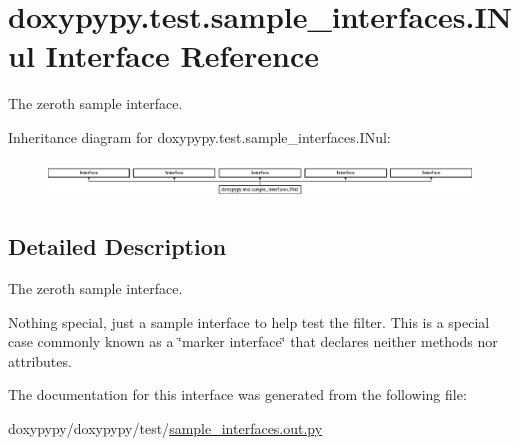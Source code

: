 \hypertarget{classdoxypypy_1_1test_1_1sample__interfaces_1_1_i_nul}{\section{doxypypy.\-test.\-sample\-\_\-interfaces.\-I\-Nul Interface Reference}
\label{classdoxypypy_1_1test_1_1sample__interfaces_1_1_i_nul}
}


The zeroth sample interface.  


Inheritance diagram for doxypypy.\-test.\-sample\-\_\-interfaces.\-I\-Nul\-:\begin{figure}[H]
\begin{center}
\leavevmode
\includegraphics[height=0.973913cm]{classdoxypypy_1_1test_1_1sample__interfaces_1_1_i_nul}
\end{center}
\end{figure}


\subsection{Detailed Description}
The zeroth sample interface. 

Nothing special, just a sample interface to help test the filter. This is a special case commonly known as a \char`\"{}marker
    interface\char`\"{} that declares neither methods nor attributes. 

The documentation for this interface was generated from the following file\-:\begin{DoxyCompactItemize}
\item 
doxypypy/doxypypy/test/\hyperlink{sample__interfaces_8out_8py}{sample\-\_\-interfaces.\-out.\-py}\end{DoxyCompactItemize}
